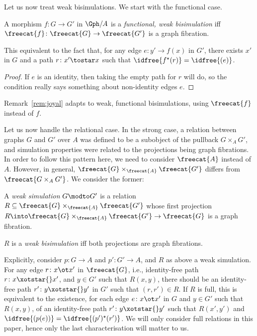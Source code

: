 \documentclass{LMCS}
\theoremstyle{plain}\newtheorem{satz}[thm]{Satz}
\begin{document}
Let us now treat weak bisimulations. We start with the functional case.
\begin{defi}
  A morphism $f \colon G \to G'$ in $\Gph/A$ is a \emph{functional,
    weak bisimulation} iff $\freecat{f} \colon \freecat{G} \to
  \freecat{G'}$ is a graph fibration.
\end{defi}
\begin{prop}
  This equivalent to the fact that, for any edge $e \colon y' \to
  f(x)$ in $G'$, there exists $x'$ in $G$ and a path $r \colon x'
  \tostar x$ such that $\idfree{f^\star(r)} = \idfree{(e)}$.
\end{prop}
\begin{proof}
  If $e$ is an identity, then taking the empty path for $r$ will do,
  so the condition really says something about non-identity edges $e$.
\end{proof}
\begin{rem}
  Remark~\ref{rem:joyal} adapts to weak, functional bisimulations,
  using $\freecat{f}$ instead of $f$.
\end{rem}


Let us now handle the relational case.  In the strong case, a relation
between graphs $G$ and $G'$ over $A$ was defined to be a subobject of
the pullback $G \times_A G'$, and simulation properties were related
to the projections being graph fibrations. In order to follow this
pattern here, we need to consider $\freecat{A}$ instead of
$A$. However, in general, $\freecat{G} \times_{\freecat{A}}
\freecat{G'}$ differs from $\freecat{G \times_A G'}$. We consider the
former:
\begin{defi}
  A \emph{weak simulation} $G \modto G'$ is a relation $R \subseteq
  \freecat{G} \times_{\freecat{A}} \freecat{G'}$ whose first projection $R
  \into \freecat{G} \times_{\freecat{A}} \freecat{G'} \to \freecat{G}$ is a
  graph fibration.
  
  $R$ is a \emph{weak bisimulation} iff both projections are graph
  fibrations.
\end{defi}
Explicitly, consider $p \colon G \to A$ and $p' \colon G' \to A$, and
$R$ as above a weak simulation. For any edge $r \colon x \ot x'$ in
$\freecat{G}$, i.e., identity-free path $r \colon x \xotstar{} x'$,
and $y \in G'$ such that $R(x,y)$, there should be an identity-free
path $r' \colon y \xotstar{} y'$ in $G'$ such that $(r,r') \in R$.  If
$R$ is full, this is equivalent to the existence, for each edge $e
\colon x \ot x'$ in $G$ and $y \in G'$ such that $R(x,y)$, of an
identity-free path $r' \colon y \xotstar{} y'$ such that $R(x',y')$
and $\idfree{(p(e))} = \idfree{(p')^\star (r')}$. We will only consider
full relations in this paper, hence only the last characterisation
will matter to us.
\end{document}
